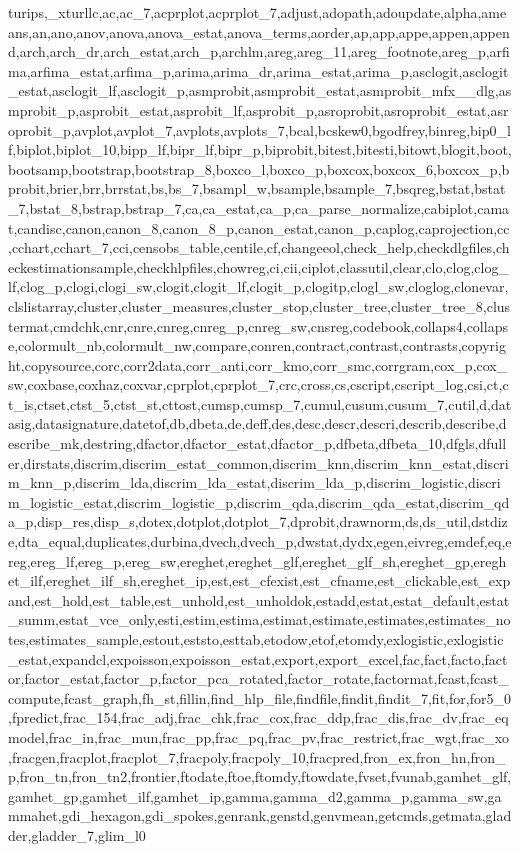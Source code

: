 {{turips,_xturllc,ac,ac_7,acprplot,acprplot_7,adjust,adopath,adoupdate,alpha,ameans,an,ano,anov,anova,anova_estat,anova_terms,aorder,ap,app,appe,appen,append,arch,arch_dr,arch_estat,arch_p,archlm,areg,areg_11,areg_footnote,areg_p,arfima,arfima_estat,arfima_p,arima,arima_dr,arima_estat,arima_p,asclogit,asclogit_estat,asclogit_lf,asclogit_p,asmprobit,asmprobit_estat,asmprobit_mfx__dlg,asmprobit_p,asprobit_estat,asprobit_lf,asprobit_p,asroprobit,asroprobit_estat,asroprobit_p,avplot,avplot_7,avplots,avplots_7,bcal,bcskew0,bgodfrey,binreg,bip0_lf,biplot,biplot_10,bipp_lf,bipr_lf,bipr_p,biprobit,bitest,bitesti,bitowt,blogit,boot,bootsamp,bootstrap,bootstrap_8,boxco_l,boxco_p,boxcox,boxcox_6,boxcox_p,bprobit,brier,brr,brrstat,bs,bs_7,bsampl_w,bsample,bsample_7,bsqreg,bstat,bstat_7,bstat_8,bstrap,bstrap_7,ca,ca_estat,ca_p,ca_parse_normalize,cabiplot,camat,candisc,canon,canon_8,canon_8_p,canon_estat,canon_p,caplog,caprojection,cc,cchart,cchart_7,cci,censobs_table,centile,cf,changeeol,check_help,checkdlgfiles,checkestimationsample,checkhlpfiles,chowreg,ci,cii,ciplot,classutil,clear,clo,clog,clog_lf,clog_p,clogi,clogi_sw,clogit,clogit_lf,clogit_p,clogitp,clogl_sw,cloglog,clonevar,clslistarray,cluster,cluster_measures,cluster_stop,cluster_tree,cluster_tree_8,clustermat,cmdchk,cnr,cnre,cnreg,cnreg_p,cnreg_sw,cnsreg,codebook,collaps4,collapse,colormult_nb,colormult_nw,compare,conren,contract,contrast,contrasts,copyright,copysource,corc,corr2data,corr_anti,corr_kmo,corr_smc,corrgram,cox_p,cox_sw,coxbase,coxhaz,coxvar,cprplot,cprplot_7,crc,cross,cs,cscript,cscript_log,csi,ct,ct_is,ctset,ctst_5,ctst_st,cttost,cumsp,cumsp_7,cumul,cusum,cusum_7,cutil,d,datasig,datasignature,datetof,db,dbeta,de,deff,des,desc,descr,descri,describ,describe,describe_mk,destring,dfactor,dfactor_estat,dfactor_p,dfbeta,dfbeta_10,dfgls,dfuller,dirstats,discrim,discrim_estat_common,discrim_knn,discrim_knn_estat,discrim_knn_p,discrim_lda,discrim_lda_estat,discrim_lda_p,discrim_logistic,discrim_logistic_estat,discrim_logistic_p,discrim_qda,discrim_qda_estat,discrim_qda_p,disp_res,disp_s,dotex,dotplot,dotplot_7,dprobit,drawnorm,ds,ds_util,dstdize,dta_equal,duplicates,durbina,dvech,dvech_p,dwstat,dydx,egen,eivreg,emdef,eq,ereg,ereg_lf,ereg_p,ereg_sw,ereghet,ereghet_glf,ereghet_glf_sh,ereghet_gp,ereghet_ilf,ereghet_ilf_sh,ereghet_ip,est,est_cfexist,est_cfname,est_clickable,est_expand,est_hold,est_table,est_unhold,est_unholdok,estadd,estat,estat_default,estat_summ,estat_vce_only,esti,estim,estima,estimat,estimate,estimates,estimates_notes,estimates_sample,estout,eststo,esttab,etodow,etof,etomdy,exlogistic,exlogistic_estat,expandcl,expoisson,expoisson_estat,export,export_excel,fac,fact,facto,factor,factor_estat,factor_p,factor_pca_rotated,factor_rotate,factormat,fcast,fcast_compute,fcast_graph,fh_st,fillin,find_hlp_file,findfile,findit,findit_7,fit,for,for5_0,fpredict,frac_154,frac_adj,frac_chk,frac_cox,frac_ddp,frac_dis,frac_dv,frac_eqmodel,frac_in,frac_mun,frac_pp,frac_pq,frac_pv,frac_restrict,frac_wgt,frac_xo,fracgen,fracplot,fracplot_7,fracpoly,fracpoly_10,fracpred,fron_ex,fron_hn,fron_p,fron_tn,fron_tn2,frontier,ftodate,ftoe,ftomdy,ftowdate,fvset,fvunab,gamhet_glf,gamhet_gp,gamhet_ilf,gamhet_ip,gamma,gamma_d2,gamma_p,gamma_sw,gammahet,gdi_hexagon,gdi_spokes,genrank,genstd,genvmean,getcmds,getmata,gladder,gladder_7,glim_l0}}
